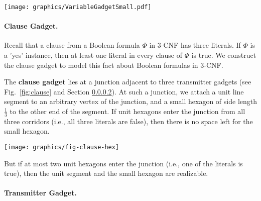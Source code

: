 \documentclass[10pt]{CSUNthesis}
\theoremstyle{plain}%
\theoremstyle{definition}
\theoremstyle{remark}
\begin{document}
\begin{minipage}{\linewidth}
\begin{center}
\texttt{[image: graphics/VariableGadgetSmall.pdf]}
\label{fig:VariableGadgetSmall.pdf}
\end{center}
\end{minipage}

\paragraph{Clause Gadget.}
Recall that a clause from a Boolean formula $\Phi$ in 3-CNF has three literals.  If $\Phi$ is a  'yes' instance, then at least one literal in every clause of $\Phi$ is true.  We construct the clause gadget to model this fact about Boolean formulas in 3-CNF.

The {\bf clause gadget} lies at a junction adjacent to three transmitter gadgets (see Fig.~\ref{fig:clause} and Section \ref{transmitterGadget}). 
At such a junction, we attach a unit line segment to an arbitrary vertex of the junction, and a small hexagon of side length $\frac{1}{3}$ to the other end of the segment. 
If unit hexagons enter the junction from all three corridors (i.e., all three literals are false), then there is no space left for the small hexagon. 

\begin{minipage}{\linewidth}
\begin{center}
\texttt{[image: graphics/fig-clause-hex]}
\label{fig:clause}
\end{center}
\end{minipage}

But if at most two unit hexagons enter the junction (i.e., one of the literals is true), then the unit segment and the small hexagon are realizable.

\paragraph{Transmitter Gadget.}\label{transmitterGadget}
\end{document}
